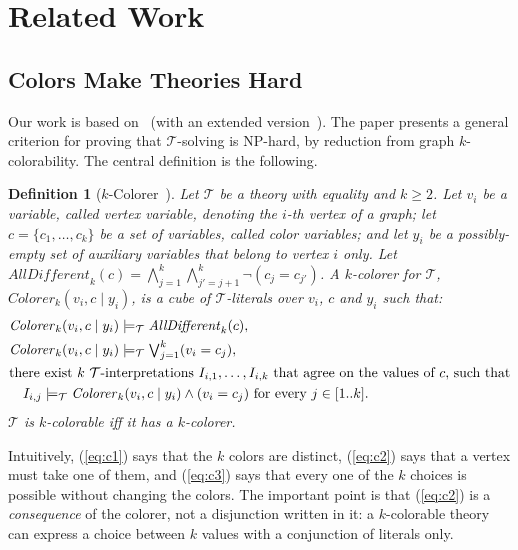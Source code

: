 \documentclass[12pt,a4paper]{article}
\newcommand{\T}{\mathcal{T}}
\newcommand{\Colorer}{\mathit{Colorer}}
\newcommand{\AllDiff}{\mathit{AllDifferent}}
\newtheorem{definition}{Definition}
\theoremstyle{definition}
\begin{document}
\section{Related Work}

\subsection{Colors Make Theories Hard}

Our work is based on~\cite{Sebastiani16} (with an extended
version~\cite{Sebastiani16ext}). The paper presents a general criterion for
proving that $\T$-solving is NP-hard, by reduction from graph $k$-colorability. The
central definition is the following.

\begin{definition}[$k$-Colorer~\cite{Sebastiani16}]\label{def:colorer}
Let $\T$ be a theory with equality and $k \geq 2$. Let $v_i$ be a variable, called
\emph{vertex variable}, denoting the $i$-th vertex of a graph; let
$c = \{c_1, \dots, c_k\}$ be a set of variables, called \emph{color variables};
and let $y_i$ be a possibly-empty set of auxiliary variables that belong to vertex
$i$ only. Let
$\AllDiff_k(c) = \bigwedge_{j=1}^{k} \bigwedge_{j'=j+1}^{k} \neg(c_j = c_{j'})$.
A \emph{$k$-colorer} for $\T$, $\Colorer_k(v_i, c \mid y_i)$, is a cube of
$\T$-literals over $v_i$, $c$ and $y_i$ such that:
\begin{align}
  & \Colorer_k(v_i, c \mid y_i) \models_\T \AllDiff_k(c), \label{eq:c1}\\
  & \Colorer_k(v_i, c \mid y_i) \models_\T \textstyle\bigvee_{j=1}^{k} (v_i = c_j), \label{eq:c2}\\
  & \text{there exist $k$ $\T$-interpretations $I_{i,1}, \dots, I_{i,k}$ that agree
     on the values of $c$, such that} \notag\\
  & \quad I_{i,j} \models_\T \Colorer_k(v_i, c \mid y_i) \wedge (v_i = c_j)
     \text{ for every } j \in [1..k]. \label{eq:c3}
\end{align}
$\T$ is \emph{$k$-colorable} iff it has a $k$-colorer.
\end{definition}

Intuitively, (\ref{eq:c1}) says that the $k$ colors are distinct, (\ref{eq:c2})
says that a vertex must take one of them, and (\ref{eq:c3}) says that every one of
the $k$ choices is possible without changing the colors. The important point is
that (\ref{eq:c2}) is a \emph{consequence} of the colorer, not a disjunction
written in it: a $k$-colorable theory can express a choice between $k$ values with
a conjunction of literals only.
\end{document}
